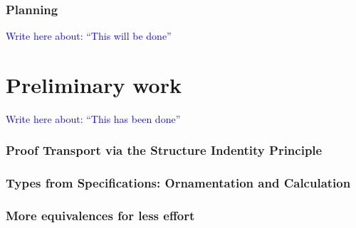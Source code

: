\documentclass{article}
\theoremstyle{plain}%
\theoremstyle{definition}
\newcommand{\towrite}[1]{\par\textcolor{blue}{Write here about: ``#1''}\par}
\begin{document}
\section{Planning}\label{sec:planning}
\towrite{This will be done}


\part{Preliminary work}\label{part:preliminary}
\towrite{This has been done}

\section{Proof Transport via the Structure Indentity Principle}\label{sec:leibniz}


\section{Types from Specifications: Ornamentation and Calculation}\label{sec:numrep}


\section{More equivalences for less effort}\label{sec:userfriendly}


\begin{comment}
\section{FingerTrees}\label{sec:fingertrees}
Fingertrees are often (rightfully so) referred to as ``the fastest persistent datastructure for most purposes'', but while simpler than implementations achieving the same bounds, they are still challenging to reason about; in this section, we will investigate how we can fit the description and analysis of fingertrees, or variants upon them, into the frameworks of calculating datastructures and ornamental programming.

We compare the work in calculating datastructures to solving associativity equations in groups by shifting to the Cayley representation, such as in [..]




\newpage
\section{Temporary}\label{sec:temp}
\listoftodos
%
\end{comment}




\printbibliography
\end{document}
